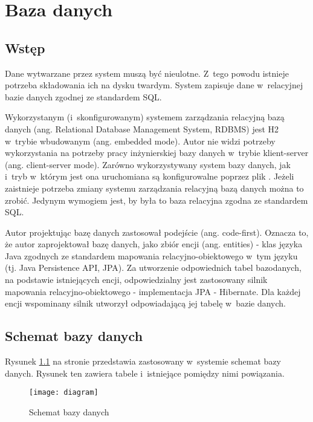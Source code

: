 \chapter{Baza danych}

\section{Wstęp}
Dane wytwarzane przez system muszą być nieulotne. Z~tego powodu istnieje potrzeba składowania ich na dysku twardym. System zapisuje dane w~relacyjnej bazie danych zgodnej ze standardem SQL. 

\medskip
Wykorzystanym (i~skonfigurowanym) systemem zarządzania relacyjną bazą danych (ang. Relational Database Management System, RDBMS) jest H2 w~trybie wbudowanym (ang. embedded mode). Autor nie widzi potrzeby wykorzystania na potrzeby pracy inżynierskiej bazy danych w~trybie klient-server (ang. client-server mode). Zarówno wykorzystywany system bazy danych, jak i~tryb w~którym jest ona uruchomiana są konfigurowalne poprzez plik . Jeżeli zaistnieje potrzeba zmiany systemu zarządzania relacyjną bazą danych można to zrobić. Jedynym wymogiem jest, by była to baza relacyjna zgodna ze standardem SQL.

\medskip
Autor projektując bazę danych zastosował podejście  (ang. code-first). Oznacza to, że autor zaprojektował bazę danych, jako zbiór encji (ang. entities) - klas języka Java zgodnych ze standardem mapowania relacyjno-obiektowego w~tym języku (tj. Java Persistence API, JPA). Za utworzenie odpowiednich tabel bazodanych, na podstawie istniejących encji, odpowiedzialny jest zastosowany silnik mapowania relacyjno-obiektowego - implementacja JPA - Hibernate. Dla każdej encji wspominany silnik utworzył odpowiadającą jej tabelę w~bazie danych.

\section{Schemat bazy danych}

\medskip
Rysunek \ref{diagram} na stronie \pageref{diagram} przedstawia zastosowany w~systemie schemat bazy danych. Rysunek ten zawiera tabele i~istniejące pomiędzy nimi powiązania. 

\begin{landscape}
\begin{figure}[!ht]
    \texttt{[image: diagram]}
    \caption{Schemat bazy danych}
    \label{diagram}
\end{figure}
\end{landscape}

